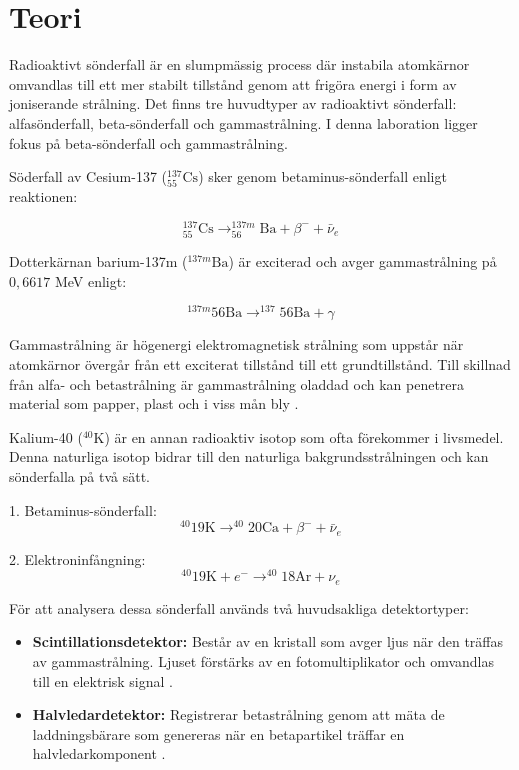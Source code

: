\section{Teori} \label{sec:theory}

Radioaktivt sönderfall är en slumpmässig process där instabila atomkärnor omvandlas till ett mer stabilt tillstånd genom att frigöra energi i form av joniserande strålning. Det finns tre huvudtyper av radioaktivt sönderfall: alfasönderfall, beta-sönderfall och gammastrålning. \parencite{yf}
I denna laboration ligger fokus på beta-sönderfall och gammastrålning.

Söderfall av Cesium-137 ($^{137}_{55}\text{Cs}$) sker genom betaminus-sönderfall enligt reaktionen:

\begin{equation}
    ^{137}_{55}\text{Cs} \to ^{137m}_{56}\text{Ba} + \beta^- + \bar{\nu}_e 
\end{equation}

Dotterkärnan barium-137m ($^{137m}\text{Ba}$) är exciterad och avger gammastrålning på $0,6617$ MeV enligt:

\begin{equation}
^{137m}{56}\text{Ba} \to ^{137}{56}\text{Ba} + \gamma 
\end{equation}

\begin{group}
\noindent
    Gammastrålning är högenergi elektromagnetisk strålning som uppstår när atomkärnor övergår från ett exciterat tillstånd till ett grundtillstånd. Till skillnad från alfa- och betastrålning är gammastrålning oladdad och kan penetrera material som papper, plast och i viss mån bly \parencite{gilmore}.
\end{group}

\indent
Kalium-40 ($^{40}\text{K}$) är en annan radioaktiv isotop som ofta förekommer i livsmedel. Denna naturliga isotop bidrar till den naturliga bakgrundsstrålningen och kan sönderfalla på två sätt. \parencite{krane}

1. Betaminus-sönderfall:
\begin{equation}
^{40}{19}\text{K} \to ^{40}{20}\text{Ca} + \beta^- + \bar{\nu}_e 
\end{equation}

2. Elektroninfångning:
\begin{equation}
^{40}{19}\text{K} + e^- \to ^{40}{18}\text{Ar} + \nu_e 
\end{equation}

För att analysera dessa sönderfall används två huvudsakliga detektortyper:
\begin{itemize}
\item \textbf{Scintillationsdetektor:} Består av en kristall som avger ljus när den träffas av gammastrålning. Ljuset förstärks av en fotomultiplikator och omvandlas till en elektrisk signal \parencite{knoll}.
\item \textbf{Halvledardetektor:} Registrerar betastrålning genom att mäta de laddningsbärare som genereras när en betapartikel träffar en halvledarkomponent \parencite{gilmore}.
\end{itemize}

